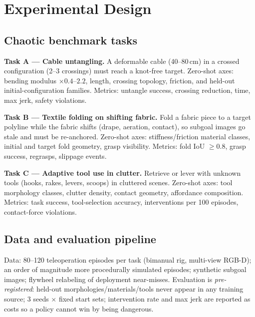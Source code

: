 \documentclass[conference,10pt]{IEEEtran}
\begin{document}
\section{Experimental Design}
\label{sec:exp}

\subsection{Chaotic benchmark tasks}
\label{sec:tasks}
\textbf{Task A --- Cable untangling.} A deformable cable (40--80\,cm) in a crossed configuration (2--3 crossings) must reach a knot-free target. Zero-shot axes: bending modulus $\times 0.4$--$2.2$, length, crossing topology, friction, and held-out initial-configuration families. Metrics: untangle success, crossing reduction, time, max jerk, safety violations.

\textbf{Task B --- Textile folding on shifting fabric.} Fold a fabric piece to a target polyline while the fabric shifts (drape, aeration, contact), so subgoal images go stale and must be re-anchored. Zero-shot axes: stiffness/friction material classes, initial and target fold geometry, grasp visibility. Metrics: fold IoU $\ge 0.8$, grasp success, regrasps, slippage events.

\textbf{Task C --- Adaptive tool use in clutter.} Retrieve or lever with unknown tools (hooks, rakes, levers, scoops) in cluttered scenes. Zero-shot axes: tool morphology classes, clutter density, contact geometry, affordance composition. Metrics: task success, tool-selection accuracy, interventions per 100 episodes, contact-force violations.

\subsection{Data and evaluation pipeline}
Data: 80--120 teleoperation episodes per task (bimanual rig, multi-view RGB-D); an order of magnitude more procedurally simulated episodes; synthetic subgoal images; flywheel relabeling of deployment near-misses. Evaluation is \emph{pre-registered}: held-out morphologies/materials/tools never appear in any training source; 3 seeds $\times$ fixed start sets; intervention rate and max jerk are reported as costs so a policy cannot win by being dangerous.
\end{document}
